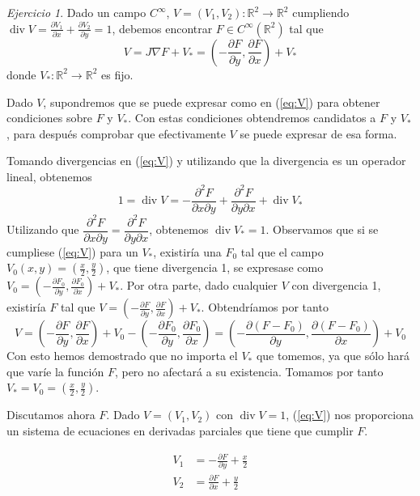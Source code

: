 \documentclass[12pt,spanish]{article}
\theoremstyle{definition}
\theoremstyle{remark}
\newtheorem{exercise}{Ejercicio}
\begin{document}
\newpage
\setcounter{exercise}{10}
\begin{exercise}
  Dado un campo $C^\infty$,
  $V=(V_1,V_2):\mathbb{R}^2\rightarrow\mathbb{R}^2$ cumpliendo
  $\operatorname{div}V=\frac{\partial V_1}{\partial x}+\frac{\partial
    V_2}{\partial y}=1$, debemos encontrar $F\in C^\infty(\mathbb{R}^2)$
  tal que
  \begin{equation} \label{eq:V}
    V=J\nabla F+V_*=\left(-\frac{\partial F}{\partial y},\frac{\partial F}{\partial x}\right)+V_*
  \end{equation} 
  donde $V_*:\mathbb{R}^2\rightarrow\mathbb{R}^2$ es fijo.

  Dado $V$, supondremos que se puede expresar como en (\ref{eq:V})
  para obtener condiciones sobre $F$ y $V_*$. Con estas condiciones
  obtendremos candidatos a $F$ y $V_*$, para después comprobar que
  efectivamente $V$ se puede expresar de esa forma.

  Tomando divergencias en (\ref{eq:V}) y utilizando que la divergencia
es un operador lineal, obtenemos
\[1=\operatorname{div}V = -\frac{\partial^2 F}{\partial x\partial
    y}+\frac{\partial^2 F}{\partial y\partial
    x}+\operatorname{div}V_*\] Utilizando que
$\dfrac{\partial^2 F}{\partial x\partial y}=\dfrac{\partial^2
  F}{\partial y\partial x}$, obtenemos
$\operatorname{div}V_*=1$. Observamos que si se cumpliese (\ref{eq:V})
para un $V_*$, existiría una $F_0$ tal que el campo
$V_0(x,y)=(\frac{x}{2},\frac{y}{2})$, que tiene divergencia 1, se
expresase como
$V_0=\left(-\frac{\partial F_0}{\partial y},\frac{\partial
    F_0}{\partial x}\right)+V_*$. Por otra parte, dado cualquier $V$
con divergencia 1, existiría $F$ tal que
$V=\left(-\frac{\partial F}{\partial y},\frac{\partial F}{\partial
    x}\right)+V_*$. Obtendríamos por tanto
\[V=\left(-\frac{\partial F}{\partial y},\frac{\partial F}{\partial
      x}\right)+V_0-\left(-\frac{\partial F_0}{\partial
      y},\frac{\partial F_0}{\partial x}\right)=\left(-\frac{\partial
      (F-F_0)}{\partial y},\frac{\partial (F-F_0)}{\partial
      x}\right)+V_0\] Con esto hemos demostrado que no importa el
$V_*$ que tomemos, ya que sólo hará que varíe la función $F$, pero no
afectará a su existencia. Tomamos por tanto
$V_*=V_0=(\frac{x}{2},\frac{y}{2})$.

Discutamos ahora $F$. Dado $V=(V_1,V_2)$ con $\operatorname{div}V=1$,
(\ref{eq:V}) nos proporciona un sistema de ecuaciones en derivadas
parciales que tiene que cumplir $F$.

\begin{align} 
   V_1&=-\frac{\partial F}{\partial y}+\frac{x}{2} \label{eq:dy}\\
   V_2&=\frac{\partial F}{\partial x}+\frac{y}{2} \label{eq:dx}
\end{align}


\end{exercise}
\end{document}
